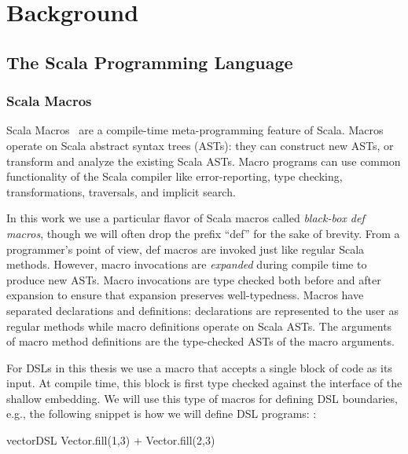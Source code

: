 \chapter{Background}
\label{ch:background}

\section{The Scala Programming Language}
\label{sec:scala}


\subsection{Scala Macros}
\label{sec:scala-macros}

Scala Macros~\cite{burmako_scala_2013} are a compile-time meta-programming
 feature of Scala. Macros operate on Scala abstract syntax trees (ASTs): they
 can construct new ASTs, or transform and analyze the existing Scala ASTs.
 Macro programs can use common functionality of the Scala compiler like
 error-reporting, type checking, transformations, traversals, and implicit
 search.

In this work we use a particular flavor of Scala macros called \emph{black-box def
 macros}, though we will often drop the prefix ``def'' for the
 sake of brevity.  From a programmer's point of view, def macros
 are invoked just like regular Scala methods.  However, macro
 invocations are \emph{expanded} during compile time to produce new
 ASTs.  Macro invocations are type checked both before and after
 expansion to ensure that expansion preserves well-typedness.  Macros
 have separated declarations and definitions: declarations are
 represented to the user as regular methods while macro definitions
 operate on Scala ASTs.  The arguments of macro method definitions are
 the type-checked ASTs of the macro arguments.

For DSLs in this thesis we use a macro that accepts a single block of
 code as its input. At compile time, this block is first type checked
 against the interface of the shallow embedding.  We will use this type of macros
 for defining DSL boundaries, e.g., the following snippet is how we will define DSL
 programs:
:\begin{lstparagraph}
vectorDSL {
  Vector.fill(1,3) + Vector.fill(2,3)
}
\end{lstparagraph}


